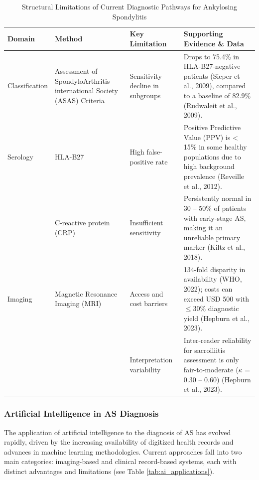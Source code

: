 \documentclass[12pt, a4paper]{article}
\begin{document}
\begin{table}[H]
\centering
\normalsize
\caption{Structural Limitations of Current Diagnostic Pathways for Ankylosing Spondylitis}
\label{tab:structural_limitations}
\begin{tabularx}{\textwidth}{p{2.5cm} p{2.5cm} p{3cm} X}
\toprule
\textbf{Domain} & \textbf{Method} & \textbf{Key Limitation} & \textbf{Supporting Evidence \& Data} \\
\midrule
Classification & Assessment of SpondyloArthritis international Society (ASAS) Criteria & Sensitivity decline in subgroups & Drops to 75.4\% in HLA-B27-negative patients (Sieper et al., 2009), compared to a baseline of 82.9\% (Rudwaleit et al., 2009). \\
\addlinespace
Serology & HLA-B27 & High false-positive rate & Positive Predictive Value (PPV) is < 15\% in some healthy populations due to high background prevalence (Reveille et al., 2012). \\
\addlinespace
& C-reactive protein (CRP) & Insufficient sensitivity & Persistently normal in 30 -- 50\% of patients with early-stage AS, making it an unreliable primary marker (Kiltz et al., 2018). \\
\addlinespace
Imaging & Magnetic Resonance Imaging (MRI) & Access and cost barriers & 134-fold disparity in availability (WHO, 2022); costs can exceed USD 500 with $\leq$30\% diagnostic yield (Hepburn et al., 2023). \\
\addlinespace
& & Interpretation variability & Inter-reader reliability for sacroiliitis assessment is only fair-to-moderate ($\kappa$ = 0.30 -- 0.60) (Hepburn et al., 2023). \\
\bottomrule
\end{tabularx}
\end{table}



\subsubsection{Artificial Intelligence in AS Diagnosis}
The application of artificial intelligence to the diagnosis of AS has evolved rapidly, driven by the increasing availability of digitized health records and advances in machine learning methodologies. Current approaches fall into two main categories: imaging-based and clinical record-based systems, each with distinct advantages and limitations (see Table \ref{tab:ai_applications}).
\end{document}
